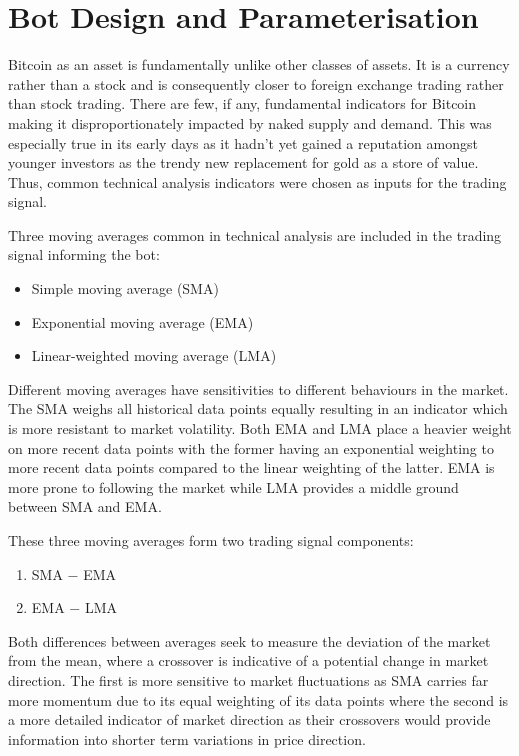 \documentclass[a4paper, 12pt]{extarticle}
\begin{document}
\newpage
\section{Bot Design and Parameterisation}
Bitcoin as an asset is fundamentally unlike other classes of assets. It is a currency rather than a stock and is consequently closer to foreign exchange trading rather than stock trading. There are few, if any, fundamental indicators for Bitcoin making it disproportionately impacted by naked supply and demand. This was especially true in its early days as it hadn't yet gained a reputation amongst younger investors as the trendy new replacement for gold as a store of value. Thus, common technical analysis indicators were chosen as inputs for the trading signal. 

Three moving averages common in technical analysis \cite{brock1992simple} are included in the trading signal informing the bot: 

\begin{itemize}
    \item Simple moving average (SMA) 
    \item Exponential moving average (EMA) 
    \item Linear-weighted moving average (LMA) 
\end{itemize}

Different moving averages have sensitivities to different behaviours in the market. The SMA weighs all historical data points equally resulting in an indicator which is more resistant to market volatility. Both EMA and LMA place a heavier weight on more recent data points with the former having an exponential weighting to more recent data points compared to the linear weighting of the latter. EMA is more prone to following the market while LMA provides a middle ground between SMA and EMA. 

These three moving averages form two trading signal components: 

\begin{enumerate}
    \item SMA $-$ EMA 
    \item EMA $-$ LMA 
\end{enumerate}

Both differences between averages seek to measure the deviation of the market from the mean, where a crossover is indicative of a potential change in market direction. The first is more sensitive to market fluctuations as SMA carries far more momentum due to its equal weighting of its data points where the second is a more detailed indicator of market direction as their crossovers would provide information into shorter term variations in price direction. 
\end{document}
